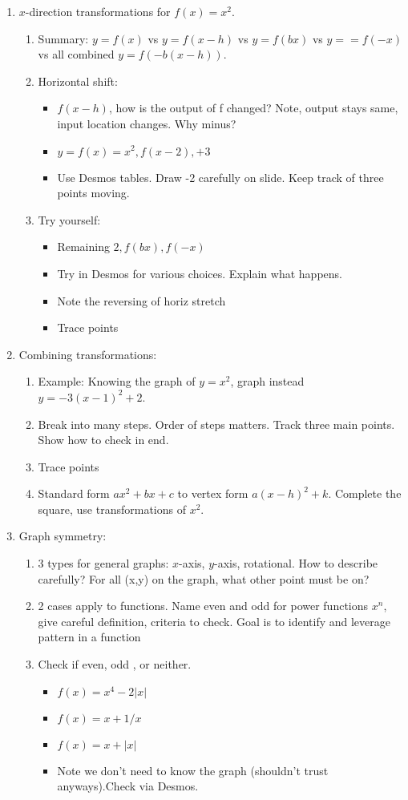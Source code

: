 \documentclass{article}
\begin{document}
\begin{enumerate}
\item $x$-direction transformations for $f(x)=x^2$.
\begin{enumerate}
\item Summary:  $y=f(x)$ vs $y=f(x-h)$ vs $y = f(bx)$ vs $y= = f(-x)$ vs all combined $y=f(-b(x-h))$.
\item Horizontal shift:
\begin{itemize}
\item $f(x-h)$, how is the output of f changed? Note, output stays same, input location changes. Why minus?
\item $y=f(x)=x^2, f(x-2), +3$
\item Use Desmos tables. Draw -2 carefully on slide. Keep track of three points moving.
\end{itemize}
\item Try yourself:
\begin{itemize}
\item Remaining $2, f(bx), f(-x)$
\item Try in Desmos for various choices. Explain what happens. 
\item Note the reversing of horiz stretch
\item Trace points
\end{itemize}
\end{enumerate}

\item Combining transformations:
\begin{enumerate}
\item Example: Knowing the graph of $y=x^2$, graph instead $y=-3(x-1)^2+2$.
\item Break into many steps. Order of steps matters. Track three main points. Show how to check in end.
\item Trace points
\item Standard form $ax^2+bx+c$ to vertex form $a(x-h)^2+k$. Complete the square, use transformations of $x^2$.
\end{enumerate}

\item Graph symmetry:
\begin{enumerate}
\item 3 types for general graphs: $x$-axis, $y$-axis, rotational. How to describe carefully? For all (x,y) on the graph, what other point must be on?
\item 2 cases apply to functions. Name even and odd for power functions $x^n$, give careful definition, criteria to check. Goal is to identify and leverage pattern in a function
\item Check if even, odd , or neither. 
\begin{itemize}
\item $f(x)=x^4-2|x|$
\item $f(x)=x+1/x$
\item $f(x)=x+|x|$
\item Note we don't need to know the graph (shouldn't trust anyways).Check via Desmos.
\end{itemize}
\end{enumerate}


\end{enumerate}
\end{document}
